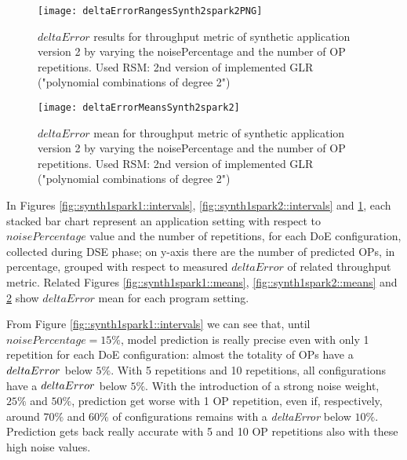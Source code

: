 \begin{figure}[htb]

    \centering
    
    \texttt{[image: deltaErrorRangesSynth2spark2PNG]}
    
     \caption{$deltaError$ results for throughput metric of synthetic application version 2 by varying the noisePercentage and the number of OP repetitions. Used RSM: 2nd version of implemented GLR ("polynomial combinations of degree 2")}
    
    \label{fig::synth2spark2::intervals}
    
\end{figure}

\begin{figure}[htb]

    \centering
    
    \texttt{[image: deltaErrorMeansSynth2spark2]}
    
    \caption{$deltaError$ mean for throughput metric of synthetic application version 2 by varying the noisePercentage and the number of OP repetitions. Used RSM: 2nd version of implemented GLR ("polynomial combinations of degree 2")}
    
    \label{fig::synth2spark2::means}
    
\end{figure}





In Figures \ref{fig::synth1spark1::intervals}, \ref{fig::synth1spark2::intervals} and \ref{fig::synth2spark2::intervals}, each stacked bar chart represent an application setting with respect to $noisePercentage$ value and the number of repetitions, for each DoE configuration, collected during DSE phase; on y-axis there are the number of predicted OPs, in percentage, grouped with respect to measured $deltaError$ of related throughput metric. Related Figures \ref{fig::synth1spark1::means}, \ref{fig::synth1spark2::means} and \ref{fig::synth2spark2::means} show $deltaError$ mean for each program setting.

From Figure \ref{fig::synth1spark1::intervals} we can see that, until $noisePercentage = 15\%$, model prediction is really precise even with only 1 repetition for each DoE configuration: almost the totality of OPs have a $del\-ta\-Er\-ror$ below $5\%$. With 5 repetitions and 10 repetitions, all configurations have a $del\-ta\-Er\-ror$ below $5\%$. With the introduction of a strong noise weight, $25\%$ and $50\%$, prediction get worse with 1 OP repetition, even if, respectively, around $70\%$ and $60\%$ of configurations remains with a \textit{deltaError} below $10\%$. Prediction gets back really accurate with 5 and 10 OP repetitions also with these high noise values.

